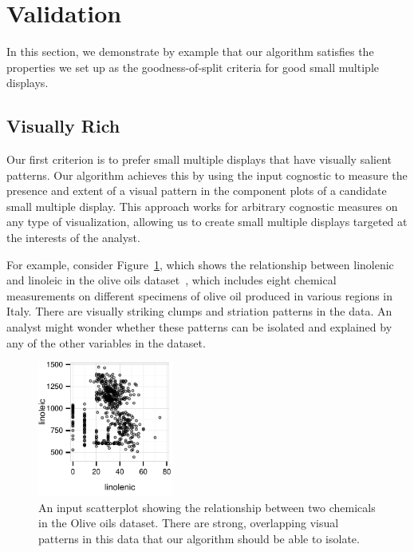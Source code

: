 \section{Validation}
\label{sec:evaluation}
In this section, we demonstrate by example that our algorithm satisfies the properties we set up as the goodness-of-split criteria for good small multiple displays.


\subsection{Visually Rich}
Our first criterion is to prefer small multiple displays that have visually salient patterns. Our algorithm achieves this by using the input cognostic to measure the presence and extent of a visual pattern in the component plots of a candidate small multiple display. This approach works for arbitrary cognostic measures on any type of visualization, allowing us to create small multiple displays targeted at the interests of the analyst. 

For example, consider Figure~\ref{fig:vrich_all}, which shows the relationship between linolenic and linoleic in the olive oils dataset~\cite{Forina1983}, which includes eight chemical measurements on different specimens of olive oil produced in various regions in Italy. There are visually striking clumps and striation patterns in the data. An analyst might wonder whether these patterns can be isolated and explained by any of the other variables in the dataset.

\begin{figure}[t]
 \centering 
	\includegraphics[width=1.75in]{images/linolenic-linoleic.pdf}
	  \caption{An input scatterplot showing the relationship between two chemicals in the Olive oils dataset. There are strong, overlapping visual patterns in this data that our algorithm should be able to isolate. }
	 \label{fig:vrich_all}
\end{figure}

